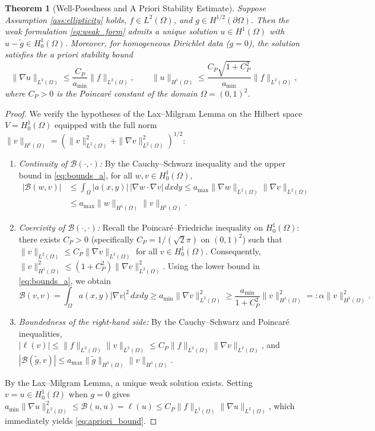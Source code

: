 \documentclass[11pt,a4paper]{article}
\newtheorem{theorem}{Theorem}[section]
\theoremstyle{definition}
\theoremstyle{remark}
\begin{document}
\begin{theorem}[Well-Posedness and A Priori Stability Estimate]
\label{thm:well_posed}
Suppose Assumption \ref{ass:ellipticity} holds, $f \in L^2(\Omega)$, and $g \in H^{1/2}(\partial\Omega)$. Then the weak formulation \eqref{eq:weak_form} admits a unique solution $u \in H^1(\Omega)$ with $u - \tilde{g} \in H_0^1(\Omega)$. Moreover, for homogeneous Dirichlet data ($g = 0$), the solution satisfies the a priori stability bound
\begin{equation}
    \|\nabla u\|_{L^2(\Omega)} \le \frac{C_P}{a_{\min}} \|f\|_{L^2(\Omega)}, \qquad \|u\|_{H^1(\Omega)} \le \frac{C_P\sqrt{1+C_P^2}}{a_{\min}} \|f\|_{L^2(\Omega)},
    \label{eq:apriori_bound}
\end{equation}
where $C_P > 0$ is the Poincaré constant of the domain $\Omega = (0,1)^2$.
\end{theorem}

\begin{proof}
We verify the hypotheses of the Lax--Milgram Lemma \cite{quarteroni2017} on the Hilbert space $V = H_0^1(\Omega)$ equipped with the full norm $\|v\|_{H^1(\Omega)} = (\|v\|_{L^2(\Omega)}^2 + \|\nabla v\|_{L^2(\Omega)}^2)^{1/2}$:
\begin{enumerate}[label=(\roman*), leftmargin=2em, itemsep=2pt]
    \item \emph{Continuity of $\mathcal{B}(\cdot,\cdot)$:} By the Cauchy--Schwarz inequality and the upper bound in \eqref{eq:bounds_a}, for all $w, v \in H_0^1(\Omega)$,
    \begin{align*}
        |\mathcal{B}(w,v)|
        &\le \int_\Omega |a(x,y)|\,|\nabla w\cdot\nabla v|\,dxdy
         \le a_{\max}\|\nabla w\|_{L^2(\Omega)}\|\nabla v\|_{L^2(\Omega)} \\
        &\le a_{\max}\|w\|_{H^1(\Omega)}\|v\|_{H^1(\Omega)}.
    \end{align*}
    \item \emph{Coercivity of $\mathcal{B}(\cdot,\cdot)$:} Recall the Poincaré--Friedrichs inequality on $H_0^1(\Omega)$: there exists $C_P > 0$ (specifically $C_P = 1/(\sqrt{2}\pi)$ on $(0,1)^2$) such that $\|v\|_{L^2(\Omega)} \le C_P \|\nabla v\|_{L^2(\Omega)}$ for all $v \in H_0^1(\Omega)$. Consequently, $\|v\|_{H^1(\Omega)}^2 \le (1 + C_P^2)\|\nabla v\|_{L^2(\Omega)}^2$. Using the lower bound in \eqref{eq:bounds_a}, we obtain
    \[
        \mathcal{B}(v,v) = \int_\Omega a(x,y)|\nabla v|^2 \, dxdy \ge a_{\min} \|\nabla v\|_{L^2(\Omega)}^2 \ge \frac{a_{\min}}{1 + C_P^2} \|v\|_{H^1(\Omega)}^2 =: \alpha \|v\|_{H^1(\Omega)}^2.
    \]
    \item \emph{Boundedness of the right-hand side:} By the Cauchy--Schwarz and Poincaré inequalities, $|\ell(v)| \le \|f\|_{L^2(\Omega)} \|v\|_{L^2(\Omega)} \le C_P \|f\|_{L^2(\Omega)} \|\nabla v\|_{L^2(\Omega)}$, and $|\mathcal{B}(\tilde{g}, v)| \le a_{\max} \|\tilde{g}\|_{H^1(\Omega)} \|v\|_{H^1(\Omega)}$.
\end{enumerate}
By the Lax--Milgram Lemma, a unique weak solution exists. Setting $v = u \in H_0^1(\Omega)$ when $g = 0$ gives $a_{\min}\|\nabla u\|_{L^2(\Omega)}^2 \le \mathcal{B}(u,u) = \ell(u) \le C_P \|f\|_{L^2(\Omega)} \|\nabla u\|_{L^2(\Omega)}$, which immediately yields \eqref{eq:apriori_bound}.
\end{proof}
\end{document}
